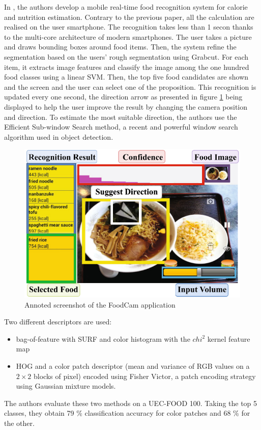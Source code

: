 In \cite{Kawano2014a}, the authors develop a mobile real-time food recognition system for calorie and nutrition estimation. Contrary to the previous paper, all the calculation are realised on the user smartphone. The recognition takes less than 1 secon thanks to the multi-core architecture of modern smartphones.
The user takes a picture and draws bounding boxes around food items. Then, the system refine the segmentation based on the users' rough segmentation using Grabcut.
For each item, it extracts image features and classify the image among the one hundred food classes using a linear SVM. Then, the top five food candidates are shown and the screen and the user can select one of the proposition.
This recognition is updated every one second, the direction arrow as presented in figure  \ref{fig:food_cam} being displayed to help the user improve the result by changing the camera position and direction. To estimate the most suitable direction, the authors use the Efficient Sub-window Search method, a recent and powerful window search algorithm used in object detection.

\begin{figure}
    \centering
    \includegraphics[scale=0.5]{img/foodcam.jpg}
    \caption{Annoted screenshot of the FoodCam application}
    \label{fig:food_cam}
\end{figure}

Two different descriptors are used:
\begin{itemize}
    \item bag-of-feature with SURF and color histogram with the $chi^2$ kernel feature map
    \item HOG and a color patch descriptor (mean and variance of RGB values on a $2 \times 2$ blocks of pixel) encoded using Fisher Victor, a patch encoding strategy using Gaussian mixture models.
\end{itemize}
The authors evaluate these two methods on a UEC-FOOD 100. Taking the top 5 classes, they obtain 79 \% classification accuracy for color patches and 68 \% for the other.
